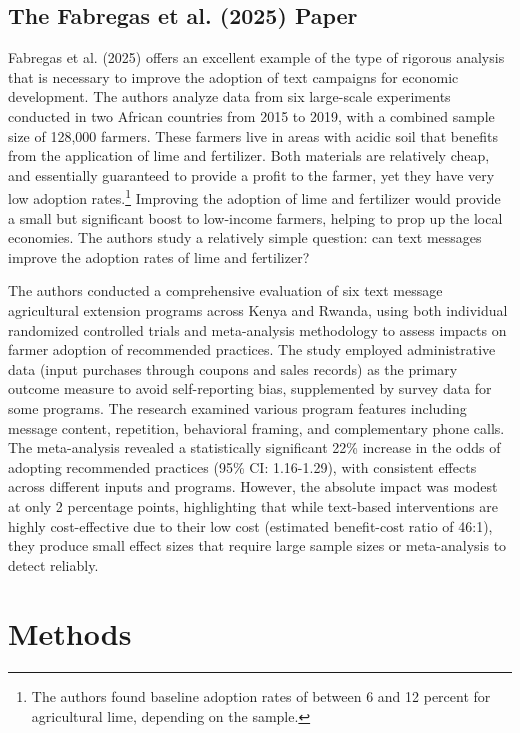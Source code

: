 \documentclass[12pt]{article}
\begin{document}
\subsection{The Fabregas et al. (2025) Paper}
Fabregas et al. (2025) offers an excellent example of the type of rigorous analysis that is necessary to improve the adoption of text campaigns for economic development. The authors analyze data from six large-scale experiments conducted in two African countries from 2015 to 2019, with a combined sample size of 128,000 farmers. These farmers live in areas with acidic soil that benefits from the application of lime and fertilizer. Both materials are relatively cheap, and essentially guaranteed to provide a profit to the farmer, yet they have very low adoption rates.\footnote{The authors found baseline adoption rates of between 6 and 12 percent for agricultural lime, depending on the sample.} Improving the adoption of lime and fertilizer would provide a small but significant boost to low-income farmers, helping to prop up the local economies. The authors study a relatively simple question: can text messages improve the adoption rates of lime and fertilizer?

The authors conducted a comprehensive evaluation of six text message agricultural extension programs across Kenya and Rwanda, using both individual randomized controlled trials and meta-analysis methodology to assess impacts on farmer adoption of recommended practices. The study employed administrative data (input purchases through coupons and sales records) as the primary outcome measure to avoid self-reporting bias, supplemented by survey data for some programs. The research examined various program features including message content, repetition, behavioral framing, and complementary phone calls. The meta-analysis revealed a statistically significant 22\% increase in the odds of adopting recommended practices (95\% CI: 1.16-1.29), with consistent effects across different inputs and programs. However, the absolute impact was modest at only 2 percentage points, highlighting that while text-based interventions are highly cost-effective due to their low cost (estimated benefit-cost ratio of 46:1), they produce small effect sizes that require large sample sizes or meta-analysis to detect reliably.

\section{Methods}
\label{section:methods}
\end{document}
